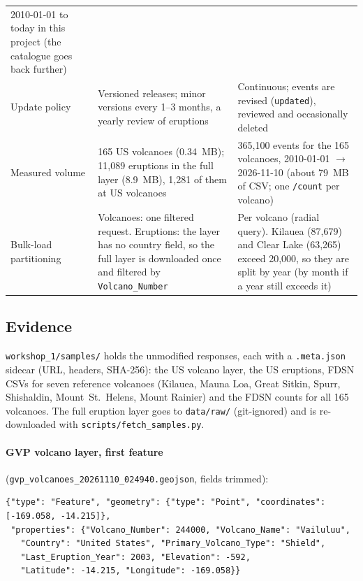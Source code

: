 \documentclass[11pt,a4paper]{article}
\begin{document}
\begin{table}[h]
\begin{tabular}{@{}L{2.5cm}L{6.2cm}L{6.2cm}@{}}
2010-01-01 to today in this project (the catalogue goes back further) \\
\addlinespace
Update policy & Versioned releases; minor versions every 1--3 months, a yearly review
of eruptions &
Continuous; events are revised (\texttt{updated}), reviewed and occasionally deleted \\
\addlinespace
Measured volume & 165 US volcanoes (0.34~MB); 11{,}089 eruptions in the full layer
(8.9~MB), 1{,}281 of them at US volcanoes &
365{,}100 events for the 165 volcanoes, 2010-01-01 $\rightarrow$ 2026-11-10 (about
79~MB of CSV; one \texttt{/count} per volcano) \\
\addlinespace
Bulk-load partitioning & Volcanoes: one filtered request. Eruptions: the layer has no
country field, so the full layer is downloaded once and filtered by
\texttt{Volcano\_Number} &
Per volcano (radial query). Kilauea (87{,}679) and Clear Lake (63{,}265) exceed
20{,}000, so they are split by year (by month if a year still exceeds it) \\
\bottomrule
\end{tabular}
\end{table}

\subsection{Evidence}

\texttt{workshop\_1/samples/} holds the unmodified responses, each with a
\texttt{.meta.json} sidecar (URL, headers, SHA-256): the US volcano layer, the US
eruptions, FDSN CSVs for seven reference volcanoes (Kilauea, Mauna Loa, Great Sitkin,
Spurr, Shishaldin, Mount~St.~Helens, Mount Rainier) and the FDSN counts for all 165
volcanoes. The full eruption layer goes to \texttt{data/raw/} (git-ignored) and is
re-downloaded with \texttt{scripts/fetch\_samples.py}.

\paragraph{GVP volcano layer, first feature}
(\texttt{gvp\_volcanoes\_20261110\_024940.geojson}, fields trimmed):

\begin{lstlisting}
{"type": "Feature", "geometry": {"type": "Point", "coordinates": [-169.058, -14.215]},
 "properties": {"Volcano_Number": 244000, "Volcano_Name": "Vailuluu",
   "Country": "United States", "Primary_Volcano_Type": "Shield",
   "Last_Eruption_Year": 2003, "Elevation": -592,
   "Latitude": -14.215, "Longitude": -169.058}}
\end{lstlisting}
\end{document}
